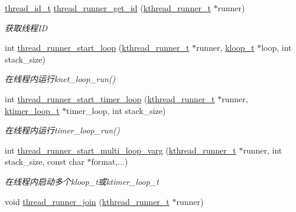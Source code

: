\begin{DoxyCompactItemize}
\hyperlink{a00056_ad0ada5642d10ce71bdd90816182f9b79_ad0ada5642d10ce71bdd90816182f9b79}{thread\+\_\+id\+\_\+t} \hyperlink{a00121_ga1f1e994ba4c42e91e4d4b120aa8eb970_ga1f1e994ba4c42e91e4d4b120aa8eb970}{thread\+\_\+runner\+\_\+get\+\_\+id} (\hyperlink{a00056_a4f78c259c9527c821f1a6f87495dd339_a4f78c259c9527c821f1a6f87495dd339}{kthread\+\_\+runner\+\_\+t} $\ast$runner)
\begin{DoxyCompactList}\small\item\em 获取线程\+I\+D \end{DoxyCompactList}\item 
int \hyperlink{a00121_ga4328cb11f2446f4da89374a1ae8a2f8e_ga4328cb11f2446f4da89374a1ae8a2f8e}{thread\+\_\+runner\+\_\+start\+\_\+loop} (\hyperlink{a00056_a4f78c259c9527c821f1a6f87495dd339_a4f78c259c9527c821f1a6f87495dd339}{kthread\+\_\+runner\+\_\+t} $\ast$runner, \hyperlink{a00056_a97fc76209a58362019f1ded9169e397f_a97fc76209a58362019f1ded9169e397f}{kloop\+\_\+t} $\ast$loop, int stack\+\_\+size)
\begin{DoxyCompactList}\small\item\em 在线程内运行knet\+\_\+loop\+\_\+run() \end{DoxyCompactList}\item 
int \hyperlink{a00121_ga943c1e0bc78abe3d7faae24ae3670d9a_ga943c1e0bc78abe3d7faae24ae3670d9a}{thread\+\_\+runner\+\_\+start\+\_\+timer\+\_\+loop} (\hyperlink{a00056_a4f78c259c9527c821f1a6f87495dd339_a4f78c259c9527c821f1a6f87495dd339}{kthread\+\_\+runner\+\_\+t} $\ast$runner, \hyperlink{a00056_a024af2aa29615e7a811ea6c45438157d_a024af2aa29615e7a811ea6c45438157d}{ktimer\+\_\+loop\+\_\+t} $\ast$timer\+\_\+loop, int stack\+\_\+size)
\begin{DoxyCompactList}\small\item\em 在线程内运行timer\+\_\+loop\+\_\+run() \end{DoxyCompactList}\item 
int \hyperlink{a00121_ga80fabbe64d1fc33e81053e51f69772d2_ga80fabbe64d1fc33e81053e51f69772d2}{thread\+\_\+runner\+\_\+start\+\_\+multi\+\_\+loop\+\_\+varg} (\hyperlink{a00056_a4f78c259c9527c821f1a6f87495dd339_a4f78c259c9527c821f1a6f87495dd339}{kthread\+\_\+runner\+\_\+t} $\ast$runner, int stack\+\_\+size, const char $\ast$format,...)
\begin{DoxyCompactList}\small\item\em 在线程内启动多个kloop\+\_\+t或ktimer\+\_\+loop\+\_\+t \end{DoxyCompactList}\item 
void \hyperlink{a00121_gad9d9269c695d6bd683c856479d525eb7_gad9d9269c695d6bd683c856479d525eb7}{thread\+\_\+runner\+\_\+join} (\hyperlink{a00056_a4f78c259c9527c821f1a6f87495dd339_a4f78c259c9527c821f1a6f87495dd339}{kthread\+\_\+runner\+\_\+t} $\ast$runner)

\end{DoxyCompactItemize}
